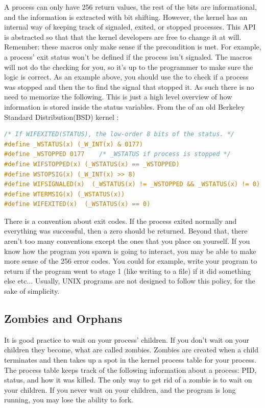 A process can only have 256 return values, the rest of the bits are informational, and the information is extracted with bit shifting.
However, the kernel has an internal way of keeping track of signaled, exited, or stopped processes.
This API is abstracted so that that the kernel developers are free to change it at will.
Remember: these macros only make sense if the precondition is met.
For example, a process' exit status won't be defined if the process isn't signaled.
The macros will not do the checking for you, so it's up to the programmer to make sure the logic is correct.
As an example above, you should use the  to check if a process was stopped and then the  to find the signal that stopped it.
As such there is no need to memorize the following. This is just a high level overview of how information is stored inside the status variables. From the  of an old Berkeley Standard Distribution(BSD) kernel \cite{sys/wait.h}:

\begin{lstlisting}[language=C]
/* If WIFEXITED(STATUS), the low-order 8 bits of the status. */
#define _WSTATUS(x) (_W_INT(x) & 0177)
#define _WSTOPPED 0177    /* _WSTATUS if process is stopped */
#define WIFSTOPPED(x) (_WSTATUS(x) == _WSTOPPED)
#define WSTOPSIG(x) (_W_INT(x) >> 8)
#define WIFSIGNALED(x)  (_WSTATUS(x) != _WSTOPPED && _WSTATUS(x) != 0)
#define WTERMSIG(x) (_WSTATUS(x))
#define WIFEXITED(x)  (_WSTATUS(x) == 0)
\end{lstlisting}

There is a convention about exit codes.
If the process exited normally and everything was successful, then a zero should be returned.
Beyond that, there aren't too many conventions except the ones that you place on yourself.
If you know how the program you spawn is going to interact, you may be able to make more sense of the 256 error codes.
You could for example, write your program to return  if the program went to stage 1 (like writing to a file)  if it did something else etc... 
Usually, UNIX programs are not designed to follow this policy, for the sake of simplicity.


\subsection{Zombies and Orphans}

It is good practice to wait on your process' children.
If you don't wait on your children they become, what are called zombies.
Zombies are created when a child terminates and then takes up a spot in the kernel process table for your process.
The process table keeps track of the following information about a process: PID, status, and how it was killed.
The only way to get rid of a zombie is to wait on your children.
If you never wait on your children, and the program is long running, you may lose the ability to fork.


